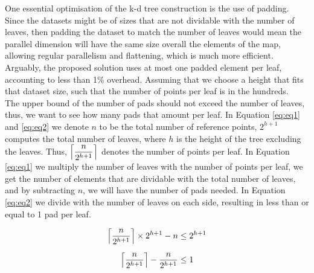 One essential optimisation of the k-d tree construction is the use of padding. Since the datasets might be of sizes that are not dividable with the number of leaves, then padding the dataset to match the number of leaves would mean the parallel dimension will have the same size overall the elements of the map, allowing regular parallelism and flattening, which is much more efficient.
\\[2mm]
Arguably, the proposed solution uses at most one padded element per leaf, accounting to less than 1\% overhead. Assuming that we choose a height that fits that dataset size, such that the number of points per leaf is in the hundreds. 
\\[2mm]
The upper bound of the number of pads should not exceed the number of leaves, thus, we want to see how many pads that amount per leaf. 
In Equation \ref{eq:eq1} and \ref{eq:eq2} we denote $n$ to be the total number of reference points, $2^{h+1}$ computes the total number of leaves, where $h$ is the height of the tree excluding the leaves. Thus, $\ceil*{\dfrac{n}{2^{h+1}}}$ denotes the number of points per leaf. In Equation \ref{eq:eq1} we multiply the number of leaves with the number of points per leaf, we get the number of elements that are dividable with the total number of leaves, and by subtracting $n$, we will have the number of pads needed. In Equation \ref{eq:eq2} we divide with the number of leaves on each side, resulting in less than or equal to 1 pad per leaf. 

\begin{align} \label{eq:eq1}
\ceil*{\dfrac{n}{2^{h+1}}} \times 2^{h+1} - n   &\leq 2^{h+1} \\[2mm]
\ceil*{\dfrac{n}{2^{h+1}}} - \dfrac{n}{2^{h+1}} &\leq 1 \label{eq:eq2}
\end{align}


